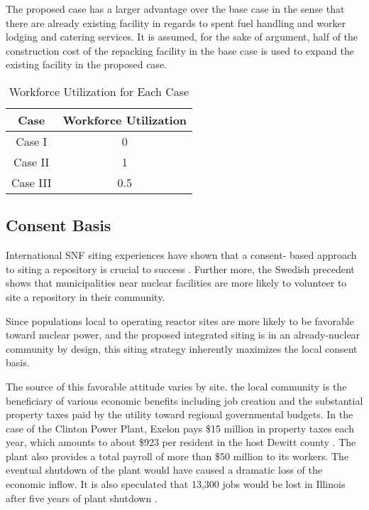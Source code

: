 The proposed case has a larger advantage over the base case in the sense that there
are already existing facility in regards to spent fuel handling and worker lodging 
and catering services. 
It is assumed, for the sake of argument, half of the construction cost of the
repacking facility in the base case is used to expand the existing facility in the
proposed case. 
\begin{table}[h]
	\centering
        \caption {Workforce Utilization for Each Case}
		\begin{tabular}{|c|c|}
			\hline
			Case & Workforce Utilization \\
			\hline
			Case I & 0 \\
			Case II & 1 \\
			Case III & 0.5\\ 
			\hline
                \end{tabular}
\end{table}


\subsection{Consent Basis}

International \gls{SNF} siting experiences have shown that a consent-
based approach to siting a repository is crucial to success
\cite{ayers_blue_2012,doe_designing_2016,jenkins-smith_public_2013,freeze_siting_2015}. 
Further more, the Swedish precedent \cite{olsson_experiences_2013} shows that 
municipalities near nuclear facilities
are more likely to volunteer to site a repository in their community.

Since populations local to operating reactor sites are more likely to be 
favorable toward nuclear power, and the proposed integrated siting 
is in an already-nuclear community by design, this siting strategy inherently 
maximizes the local consent basis.

The source of this favorable attitude varies by site. 
the local community is the beneficiary of various economic benefits
including job creation and the substantial property taxes paid by the utility 
toward regional governmental budgets.   In the case of the Clinton Power Plant, 
Exelon pays \$15 million in property taxes each year, which amounts to about 
\$923 per resident in the host Dewitt county \cite{brady-lunny_dewitt_2016}. The plant
also provides a total payroll of more than \$50 million to its workers.
The eventual shutdown of the plant would have caused a dramatic loss of the economic inflow.
It is also speculated that 13,300 jobs would be lost in Illinois after five years 
of plant shutdown \cite{reid_study:_2014}.  

